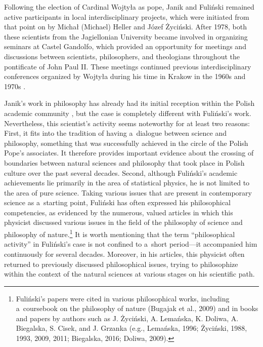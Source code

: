 Following the election of Cardinal Wojtyła as pope, Janik and Fuliński remained active participants in local interdisciplinary projects, which were initiated from that point on by Michał (Michael) Heller and Józef Życiński. After 1978, both these scientists from the Jagiellonian University became involved in organizing seminars at Castel Gandolfo, which provided an opportunity for meetings and discussions between scientists, philosophers, and theologians throughout the pontificate of John Paul II. These meetings continued previous interdisciplinary conferences organized by Wojtyła during his time in Krakow in the 1960s and 1970s 
\parencite[][]{trombik_stworzyc_2022}.%




Janik's work in philosophy has already had its initial reception within the Polish academic community 
\parencite[][]{fulinski_profesor_2015}, %
 but the case is completely different with Fuliński's work. Nevertheless, this scientist's activity seems noteworthy for at least two reasons: First, it fits into the tradition of having a~dialogue between science and philosophy, something that was successfully achieved in the circle of the Polish Pope's associates. It therefore provides important evidence about the crossing of boundaries between natural sciences and philosophy that took place in Polish culture over the past several decades. Second, although Fuliński's academic achievements lie primarily in the area of statistical physics, he is not limited to the area of pure science. Taking various issues that are present in contemporary science as a~starting point, Fuliński has often expressed his philosophical competencies, as evidenced by the numerous, valued articles in which this physicist discussed various issues in the field of the philosophy of science and philosophy of nature.\footnote{Fuliński's papers were cited in various philosophical works, including a~coursebook on the philosophy of nature (Bugajak et al., 2009) and in books and papers by authors such as J. Życiński, A. Lemańska, K. Doliwa, A. Biegalska, S. Cisek, and J. Grzanka (e.g., Lemańska, 1996; Życiński, 1988, 1993, 2009, 2011; Biegalska, 2016; Doliwa, 2009).} It is worth mentioning that the term ``philosophical activity'' in Fuliński's case is not confined to a~short period---it accompanied him continuously for several decades. Moreover, in his articles, this physicist often returned to previously discussed philosophical issues, trying to philosophize within the context of the natural sciences at various stages on his scientific path.



